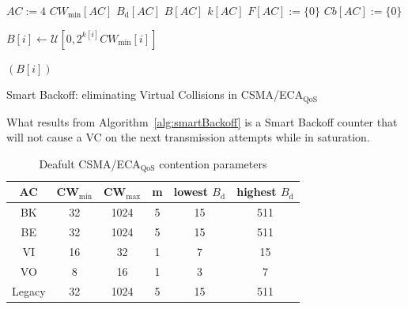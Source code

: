 
	\begin{algorithm}[t]
		$AC:=4$
		$CW_{\min}[AC]$
		$B_{\text{d}}[AC]$
		$B[AC]$
		$k[AC]$
		$F[AC]:=\{0\}$\;
		$Cb[AC]:=\{0\}$\;
		\tcp{}\tcp{}
		{
			$B[i]\gets\mathcal{U}[0,2^{k[i]}{CW_{\min}[i]}]$\;
			{
			}
			
			
		}
		\Return $(B[i])$\;
		\vspace{0.2cm}
		\caption{Smart Backoff: eliminating Virtual Collisions in CSMA/ECA$_{\text{QoS}}$}
		\label{alg:smartBackoff}
	\end{algorithm}

What results from Algorithm~\ref{alg:smartBackoff} is a Smart Backoff counter that will not cause a VC on the next transmission attempts while in saturation.

	\begin{table}[tb]
		\centering
		\caption{Deafult CSMA/ECA$_{\text{QoS}}$ contention parameters}
		\label{tab:ecaQosParams}
		\begin{tabular}{|c|c|c|c|c|c|}
			\hline
			{\bfseries AC} & {\bfseries CW$_{\min}$} & {\bfseries CW$_{\max}$} & {\bfseries m} & {\bfseries lowest $B_{\text{d}}$} & {\bfseries highest $B_{\text{d}}$}\\
			\hline
			BK		       &	32				&		1024		  & 		5	&			15		        &		511\\
			BE		       &	32				&		1024		  &		5	&			15		        &		511\\
			VI		       &	16				&		32		  & 		1	&			7		        &		15\\
			VO		       &	8				&		16		  & 		1	&			3		        &		7\\
			Legacy	       &	32				&		1024		  & 		5	&			15		        &		511\\
			\hline
		\end{tabular}
	\end{table}


